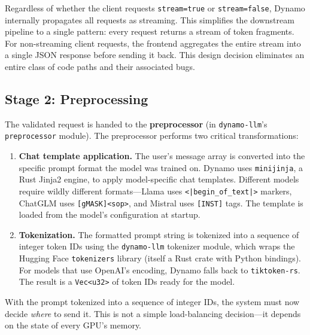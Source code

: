 \begin{notebox}
Regardless of whether the client requests \texttt{stream=true} or \texttt{stream=false}, Dynamo internally propagates all requests as streaming. This simplifies the downstream pipeline to a single pattern: every request returns a stream of token fragments. For non-streaming client requests, the frontend aggregates the entire stream into a single JSON response before sending it back. This design decision eliminates an entire class of code paths and their associated bugs.
\end{notebox}

\subsection{Stage 2: Preprocessing}

The validated request is handed to the \textbf{preprocessor} (in \texttt{dynamo-llm}'s \texttt{preprocessor} module). The preprocessor performs two critical transformations:

\begin{enumerate}
  \item \textbf{Chat template application.} The user's message array is converted into the specific prompt format the model was trained on. Dynamo uses \texttt{minijinja}, a Rust Jinja2 engine, to apply model-specific chat templates. Different models require wildly different formats---Llama uses \texttt{<|begin\_of\_text|>} markers, ChatGLM uses \texttt{[gMASK]<sop>}, and Mistral uses \texttt{[INST]} tags. The template is loaded from the model's configuration at startup.

  \item \textbf{Tokenization.} The formatted prompt string is tokenized into a sequence of integer token IDs using the \texttt{dynamo-llm} tokenizer module, which wraps the Hugging Face \texttt{tokenizers} library (itself a Rust crate with Python bindings). For models that use OpenAI's encoding, Dynamo falls back to \texttt{tiktoken-rs}. The result is a \texttt{Vec<u32>} of token IDs ready for the model.
\end{enumerate}

%

With the prompt tokenized into a sequence of integer IDs, the system must now decide \emph{where} to send it. This is not a simple load-balancing decision---it depends on the state of every GPU's memory.

